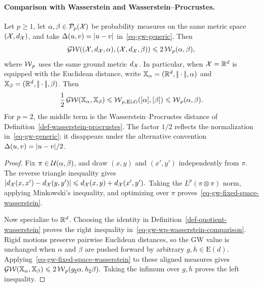 \paragraph{Comparison with Wasserstein and Wasserstein--Procrustes.}
\begin{prop}\label{prop-gw-wasserstein-procrustes-comparison}\label{prop-gw-controlled-by-wasserstein}\label{prop-gw-procrustes-upper-certificate}
Let $p\geq1$, let $\alpha,\beta\in\mathcal{P}_p(\mathcal{X})$ be probability measures on the same metric space $(\mathcal{X},d_{\mathcal{X}})$, and take $\Delta(u,v)=|u-v|$ in~\eqref{eq-gw-generic}. Then
\begin{equation}\label{eq-gw-fixed-space-wasserstein}
\operatorname{\mathcal{GW}}((\mathcal{X},d_{\mathcal{X}},\alpha),(\mathcal{X},d_{\mathcal{X}},\beta))
\leqslant
2\operatorname{\mathcal{W}}_p(\alpha,\beta),
\end{equation}
where $\operatorname{\mathcal{W}}_p$ uses the same ground metric $d_{\mathcal{X}}$. In particular, when $\mathcal{X}=\mathbb{R}^d$ is equipped with the Euclidean distance, write $\mathbb{X}_\alpha=(\mathbb{R}^d,|\!| \cdot |\!|,\alpha)$ and $\mathbb{X}_\beta=(\mathbb{R}^d,|\!| \cdot |\!|,\beta)$. Then
\begin{equation}\label{eq-gw-wp-wasserstein-comparison}
\frac12\operatorname{\mathcal{GW}}(\mathbb{X}_\alpha,\mathbb{X}_\beta)
\leqslant
\operatorname{\mathcal{W}}_{p,\mathrm E(d)}([\alpha],[\beta])
\leqslant
\operatorname{\mathcal{W}}_p(\alpha,\beta).
\end{equation}
For $p=2$, the middle term is the Wasserstein--Procrustes distance of Definition~\ref{def-wasserstein-procrustes}. The factor $1/2$ reflects the normalization in~\eqref{eq-gw-generic}; it disappears under the alternative convention $\Delta(u,v)=|u-v|/2$.
\end{prop}
\begin{proof}
Fix $\pi\in\mathcal{U}(\alpha,\beta)$, and draw $(x,y)$ and $(x',y')$ independently from $\pi$. The reverse triangle inequality gives \(\left\lvert d_{\mathcal{X}}(x,x')-d_{\mathcal{X}}(y,y')\right\rvert \leqslant d_{\mathcal{X}}(x,y)+d_{\mathcal{X}}(x',y').\)
Taking the $L^p(\pi\otimes\pi)$ norm, applying Minkowski's inequality, and optimizing over $\pi$ proves~\eqref{eq-gw-fixed-space-wasserstein}.

Now specialize to $\mathbb{R}^d$. Choosing the identity in Definition~\ref{def-quotient-wasserstein} proves the right inequality in~\eqref{eq-gw-wp-wasserstein-comparison}. Rigid motions preserve pairwise Euclidean distances, so the GW value is unchanged when $\alpha$ and $\beta$ are pushed forward by arbitrary $g,h\in\mathrm E(d)$. Applying~\eqref{eq-gw-fixed-space-wasserstein} to these aligned measures gives
\(\operatorname{\mathcal{GW}}(\mathbb{X}_\alpha,\mathbb{X}_\beta) \leqslant 2\operatorname{\mathcal{W}}_p(g_\sharp\alpha,h_\sharp\beta).\)
Taking the infimum over $g,h$ proves the left inequality.
\end{proof}
